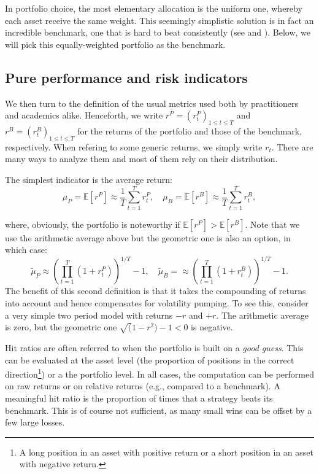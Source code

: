 \documentclass[]{krantz}
\let\rmarkdownfootnote\footnote%
\def\footnote{\protect\rmarkdownfootnote}
\theoremstyle{definition}
\theoremstyle{definition}
\theoremstyle{definition}
\theoremstyle{remark}
\begin{document}
In portfolio choice, the most elementary allocation is the uniform one,
whereby each asset receive the same weight. This seemingly simplistic
solution is in fact an incredible benchmark, one that is hard to beat
consistently (see \citet{demiguel2007optimal} and
\citet{plyakha2014equal}). Below, we will pick this equally-weighted
portfolio as the benchmark.

\hypertarget{pure-performance-and-risk-indicators}{%
\subsection{Pure performance and risk
indicators}\label{pure-performance-and-risk-indicators}}

We then turn to the definition of the usual metrics used both by
practitioners and academics alike. Henceforth, we write
\(r^P=(r_t^P)_{1\le t\le T}\) and \(r^B=(r_t^B)_{1\le t\le T}\) for the
returns of the portfolio and those of the benchmark, respectively. When
refering to some generic returns, we simply write \(r_t\). There are
many ways to analyze them and most of them rely on their distribution.

The simplest indicator is the average return:
\[\mu_P=\mathbb{E}[r^P]\approx \frac{1}{T}\sum_{t=1}^T r_t^P, \quad \mu_B=\mathbb{E}[r^B]\approx \frac{1}{T}\sum_{t=1}^T r_t^B,\]

where, obviously, the portfolio is noteworthy if
\(\mathbb{E}[r^P]>\mathbb{E}[r^B]\). Note that we use the arithmetic
average above but the geometric one is also an option, in which case:
\[\tilde{\mu}_P\approx \left(\prod_{t=1}^T(1+r^P_t) \right)^{1/T}-1 , \quad \tilde{\mu}_B=\approx  \left(\prod_{t=1}^T(1+r^B_t) \right)^{1/T}-1.\]
The benefit of this second definition is that it takes the compounding
of returns into account and hence compensates for volatility pumping. To
see this, consider a very simple two period model with returns \(-r\)
and \(+r\). The arithmetic average is zero, but the geometric one
\(\sqrt(1-r^2)-1<0\) is negative.

Hit ratios are often referred to when the portfolio is built on a
\emph{good guess}. This can be evaluated at the asset level (the
proportion of positions in the correct direction\footnote{A long
  position in an asset with positive return or a short position in an
  asset with negative return.}) or a the portfolio level. In all cases,
the computation can be performed on raw returns or on relative returns
(e.g., compared to a benchmark). A meaningful hit ratio is the
proportion of times that a strategy beats its benchmark. This is of
course not sufficient, as many small wins can be offset by a few large
losses.
\end{document}
